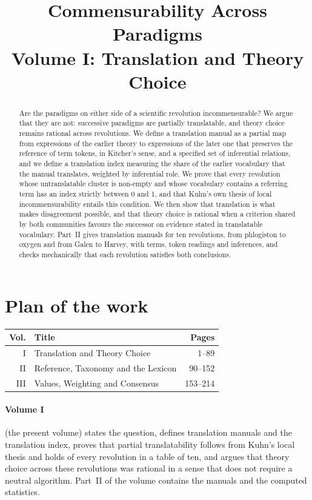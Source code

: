 \documentclass{situationist-preprint}
\title{Commensurability Across Paradigms\\[0.4em]\large Volume I: Translation and Theory Choice}
\begin{document}
\maketitle

\begin{abstract}
Are the paradigms on either side of a scientific revolution incommensurable? We argue that they are not: successive paradigms are partially translatable, and theory choice remains rational across revolutions. We define a translation manual as a partial map from expressions of the earlier theory to expressions of the later one that preserves the reference of term tokens, in Kitcher's sense, and a specified set of inferential relations, and we define a translation index measuring the share of the earlier vocabulary that the manual translates, weighted by inferential role. We prove that every revolution whose untranslatable cluster is non-empty and whose vocabulary contains a referring term has an index strictly between 0 and 1, and that Kuhn's own thesis of local incommensurability entails this condition. We then show that translation is what makes disagreement possible, and that theory choice is rational when a criterion shared by both communities favours the successor on evidence stated in translatable vocabulary. Part~II gives translation manuals for ten revolutions, from phlogiston to oxygen and from Galen to Harvey, with \ntermsall{} terms, \ntokensall{} token readings and \ninfall{} inferences, and checks mechanically that each revolution satisfies both conclusions.
\end{abstract}

\section*{Plan of the work}

\begin{center}\small
\begin{tabular}{@{}rlr@{}}
\toprule
Vol. & Title & Pages \\
\midrule
I & Translation and Theory Choice & 1--89 \\
II & Reference, Taxonomy and the Lexicon & 90--152 \\
III & Values, Weighting and Consensus & 153--214 \\
\bottomrule
\end{tabular}
\end{center}

\paragraph{Volume I} (the present volume) states the question, defines translation manuals and the translation index, proves that partial translatability follows from Kuhn's local thesis and holds of every revolution in a table of ten, and argues that theory choice across these revolutions was rational in a sense that does not require a neutral algorithm. Part~II of the volume contains the manuals and the computed statistics.
\end{document}
